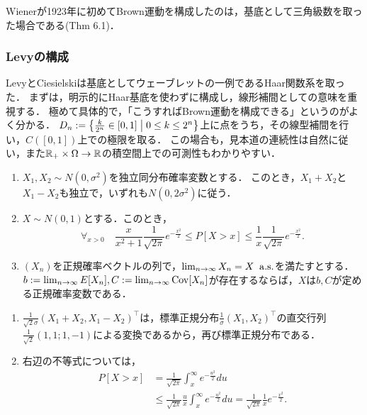 \documentclass[uplatex,dvipdfmx]{jsreport}
\begin{document}
\begin{tcolorbox}[colframe=ForestGreen, colback=ForestGreen!10!white,breakable,colbacktitle=ForestGreen!40!white,coltitle=black,fonttitle=\bfseries\sffamily,
title=]
    Wienerが1923年に初めてBrown運動を構成したのは，基底として三角級数を取った場合である\cite{Bass}(Thm 6.1)．
\end{tcolorbox}

\subsubsection{Levyの構成}

\begin{tcolorbox}[colframe=ForestGreen, colback=ForestGreen!10!white,breakable,colbacktitle=ForestGreen!40!white,coltitle=black,fonttitle=\bfseries\sffamily,
title=]
    LevyとCiesielskiは基底としてウェーブレットの一例であるHaar関数系を取った．
    まずは，明示的にHaar基底を使わずに構成し，線形補間としての意味を重視する．
    極めて具体的で，「こうすればBrown運動を構成できる」というのがよく分かる．
    $D_n:=\left\{\frac{k}{2^n}\in[0,1]\;\middle|\;0\le k\le 2^n\right\}$上に点をうち，その線型補間を行い，$C([0,1])$上での極限を取る．
    この場合も，見本道の連続性は自然に従い，また$\mathbb{R}_+\times\Omega\to\mathbb{R}$の積空間上での可測性もわかりやすい．
\end{tcolorbox}

\begin{lemma}\mbox{}
    \begin{enumerate}
        \item $X_1,X_2\sim N(0,\sigma^2)$を独立同分布確率変数とする．
        このとき，$X_1+X_2$と$X_1-X_2$も独立で，いずれも$N(0,2\sigma^2)$に従う．
        \item $X\sim N(0,1)$とする．このとき，
        \[\forall_{x>0}\quad\frac{x}{x^2+1}\frac{1}{\sqrt{2\pi}}e^{-\frac{x^2}{2}}\le P[X>x]\le\frac{1}{x}\frac{1}{\sqrt{2\pi}}e^{-\frac{x^2}{2}}.\]
        \item $(X_n)$を正規確率ベクトルの列で，$\lim_{n\to\infty}X_n=X\;\;\mathrm{a.s.}$を満たすとする．$b:=\lim_{n\to\infty}E[X_n],C:=\lim_{n\to\infty}\mathrm{Cov}[X_n]$が存在するならば，$X$は$b,C$が定める正規確率変数である．
    \end{enumerate}
\end{lemma}
\begin{Proof}\mbox{}
    \begin{enumerate}
        \item $\frac{1}{\sqrt{2}\sigma}(X_1+X_2,X_1-X_2)^\top$は，標準正規分布$\frac{1}{\sigma}(X_1,X_2)^\top$の直交行列$\frac{1}{\sqrt{2}}(1,1;1,-1)$による変換であるから，再び標準正規分布である．
        \item 右辺の不等式については，
        \begin{align*}
            P[X>x]&=\frac{1}{\sqrt{2\pi}}\int^\infty_xe^{-\frac{u^2}{2}}du\\
            &\le\frac{1}{\sqrt{2\pi}}\frac{u}{x}\int^\infty_xe^{-\frac{u^2}{2}}du
            =\frac{1}{\sqrt{2\pi}}\frac{1}{x}e^{-\frac{x^2}{2}}.
        \end{align*}
    \end{enumerate}
\end{Proof}
\end{document}
